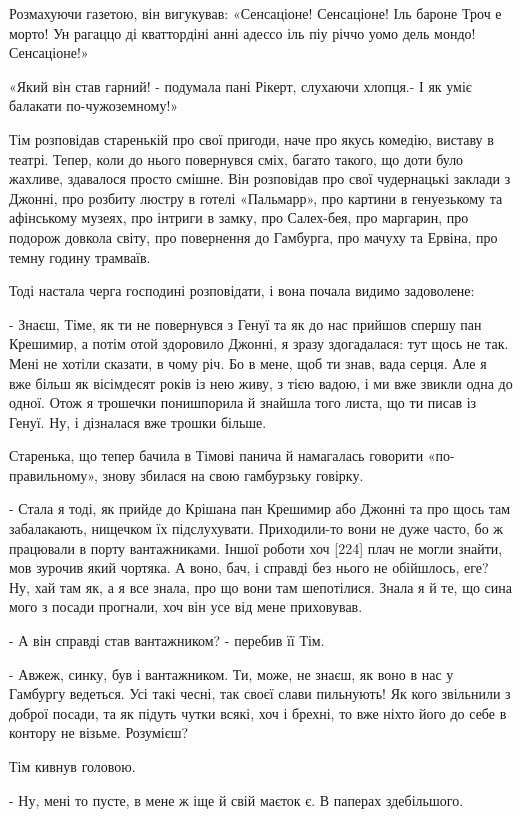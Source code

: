 Розмахуючи газетою, він вигукував: «Сенсаціоне! Сенсаціоне! Іль бароне Троч е морто! Ун рагаццо ді кваттордіні анні адессо іль піу річчо уомо дель мондо! Сенсаціоне!»

«Який він став гарний! - подумала пані Рікерт, слухаючи хлопця.- І як уміє балакати по-чужоземному!»

Тім розповідав старенькій про свої пригоди, наче про якусь комедію, виставу в театрі. Тепер, коли до нього повернувся сміх, багато такого, що доти було жахливе, здавалося просто смішне. Він розповідав про свої чудернацькі заклади з Джонні, про розбиту люстру в готелі «Пальмарр», про картини в генуезькому та афінському музеях, про інтриги в замку, про Салех-бея, про маргарин, про подорож довкола світу, про повернення до Гамбурга, про мачуху та Ервіна, про темну годину трамваїв.

Тоді настала черга господині розповідати, і вона почала видимо задоволене:

- Знаєш, Тіме, як ти не повернувся з Генуї та як до нас прийшов спершу пан Крешимир, а потім отой здоровило Джонні, я зразу здогадалася: тут щось не так. Мені не хотіли сказати, в чому річ. Бо в мене, щоб ти знав, вада серця. Але я вже більш як вісімдесят років із нею живу, з тією вадою, і ми вже звикли одна до одної. Отож я трошечки понишпорила й знайшла того листа, що ти писав із Генуї. Ну, і дізналася вже трошки більше.

Старенька, що тепер бачила в Тімові панича й намагалась говорити «по-правильному», знову збилася на свою гамбурзьку говірку.

- Стала я тоді, як прийде до Крішана пан Крешимир або Джонні та про щось там забалакають, нищечком їх підслухувати. Приходили-то вони не дуже часто, бо ж працювали в порту вантажниками. Іншої роботи хоч [224] плач не могли знайти, мов зурочив який чортяка. А воно, бач, і справді без нього не обійшлось, еге? Ну, хай там як, а я все знала, про що вони там шепотілися. Знала я й те, що сина мого з посади прогнали, хоч він усе від мене приховував.

- А він справді став вантажником? - перебив її Тім.

- Авжеж, синку, був і вантажником. Ти, може, не знаєш, як воно в нас у Гамбургу ведеться. Усі такі чесні, так своєї слави пильнують! Як кого звільнили з доброї посади, та як підуть чутки всякі, хоч і брехні, то вже ніхто його до себе в контору не візьме. Розумієш?

Тім кивнув головою.

- Ну, мені то пусте, в мене ж іще й свій маєток є. В паперах здебільшого.

